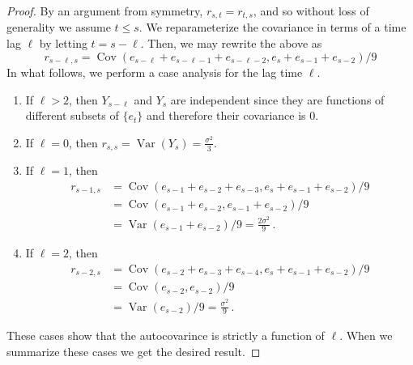 \documentclass[10pt]{fphw}
\newcommand{\var}{\operatorname{Var}}
\newcommand{\cov}{\operatorname{Cov}}
\begin{document}
\begin{enumerate}
\begin{proof}
By an argument from symmetry, $r_{s,t} = r_{t,s}$, and so without loss of generality we assume $t \leq s$.
We reparameterize the covariance in terms of a time lag $\ell$ by letting $t = s - \ell$.
Then, we may rewrite the above as
\begin{equation*}
r_{s-\ell,s} = \cov(e_{s-\ell} + e_{s-\ell-1} + e_{s-\ell-2},e_s + e_{s-1} + e_{s-2})/9
\end{equation*}
In what follows, we perform a case analysis for the lag time $\ell$.
\begin{enumerate}[i]
\item If $\ell > 2$, then $Y_{s-\ell}$ and $Y_{s}$ are independent since they are functions of different subsets of $\{e_t\}$ and therefore their covariance is $0$.
\item If $\ell=0$, then $r_{s,s} = \var(Y_s) = \frac{\sigma^2}{3}$.
\item If $\ell=1$, then
\begin{equation*}
\begin{split}
    r_{s-1,s} &= \cov(e_{s-1} + e_{s-2} + e_{s-3},e_s + e_{s-1} + e_{s-2})/9\\
    &= \cov(e_{s-1} + e_{s-2},e_{s-1} + e_{s-2})/9\\
    &= \var(e_{s-1} + e_{s-2})/9 = \frac{2 \sigma^2}{9}\,.
\end{split}
\end{equation*}
\item If $\ell=2$, then
\begin{equation*}
\begin{split}
r_{s-2,s} &= \cov(e_{s-2} + e_{s-3} + e_{s-4},e_s + e_{s-1} + e_{s-2})/9\\
&= \cov(e_{s-2},e_{s-2})/9\\
&= \var(e_{s-2})/9 = \frac{\sigma^2}{9}\,.
\end{split}
\end{equation*}
\end{enumerate}
These cases show that the autocovarince is strictly a function of $\ell$.
When we summarize these cases we get the desired result.
\end{proof}


\end{enumerate}
\end{document}
